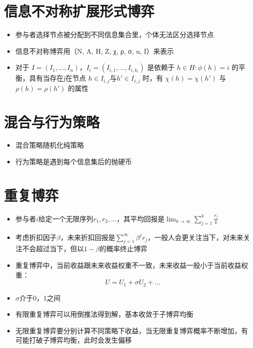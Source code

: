 \documentclass[]{book}
\providecommand{\tightlist}{%
  \setlength{\itemsep}{0pt}\setlength{\parskip}{0pt}}
\begin{document}
\hypertarget{ux4fe1ux606fux4e0dux5bf9ux79f0ux6269ux5c55ux5f62ux5f0fux535aux5f08}{%
\section{信息不对称扩展形式博弈}\label{ux4fe1ux606fux4e0dux5bf9ux79f0ux6269ux5c55ux5f62ux5f0fux535aux5f08}}

\begin{itemize}
\tightlist
\item
  参与者选择节点被分配到不同信息集合里，个体无法区分选择节点
\item
  信息不对称博弈用（N, A, H, Z, χ, ρ, σ, u, I）来表示
\item
  对于 \(I = (I_1,...,I_n)\)，\(I_i = (I_{i,1},...,I_{i,k_i})\) 是依赖于 \({h\in H: \phi (h) = i}\) 的平衡，具有当存在j在节点 \(h\in I_{i,j}\)与\(h'\in I_{i,j}\) 时，有 \(\chi(h) = \chi(h')\) 与 \(\rho(h) = \rho(h')\) 的属性
\end{itemize}

\hypertarget{ux6df7ux5408ux4e0eux884cux4e3aux7b56ux7565}{%
\section{混合与行为策略}\label{ux6df7ux5408ux4e0eux884cux4e3aux7b56ux7565}}

\begin{itemize}
\tightlist
\item
  混合策略随机化纯策略
\item
  行为策略是遇到每个信息集后的抛硬币
\end{itemize}

\hypertarget{ux91cdux590dux535aux5f08}{%
\section{重复博弈}\label{ux91cdux590dux535aux5f08}}

\begin{itemize}
\tightlist
\item
  参与者\(i\)给定一个无限序列\(r_1,r_2,...\)，其平均回报是\(\lim_{k\rightarrow\infty}\sum_{j=1}^k\frac{r_j}{k}\)
\item
  考虑折扣因子\(\beta\)，未来折扣回报是\(\sum_{j=1}^{\infty}\beta^jr_j\)，一般人会更关注当下，对未来关注不会超过当下，但以\(1-\beta\)的概率终止博弈
\item
  重复博弈中，当前收益跟未来收益权重不一致，未来收益一般小于当前收益权重：
  \[U = U_1 + \sigma U_2+ ...\]
\item
  \(\sigma\)介于0，1之间
\item
  有限重复博弈可以用倒推法得到解，基本收敛于子博弈均衡
\item
  无限重复博弈要分别计算不同策略下收益，当无限重复博弈概率不断增加，有可能打破子博弈均衡，此时会发生偏移
\end{itemize}
\end{document}

